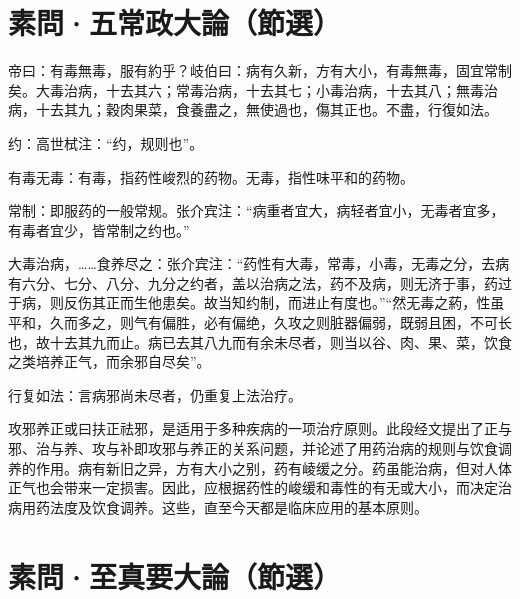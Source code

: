 \documentclass[draft,12pt]{ctexbook}
\begin{document}

\section{素問·五常政大論（節選）}%


\begin{yuanwen}
帝曰：有毒無毒，服有約乎？岐伯曰：病有久新，方有大小，有毒無毒，固宜常制矣。大毒治病，十去其六；常毒治病，十去其七；小毒治病，十去其八；無毒治病，十去其九；穀肉果菜，食養盡之，無使過也，傷其正也。不盡，行復如法。
\end{yuanwen}


\begin{jiaozhu}
	\item 约：高世栻注：“约，规则也”。
	\item 有毒无毒：有毒，指药性峻烈的药物。无毒，指性味平和的药物。
	\item 常制：即服药的一般常规。张介宾注：“病重者宜大，病轻者宜小，无毒者宜多，有毒者宜少，皆常制之约也。”
	\item 大毒治病，……食养尽之：张介宾注：“药性有大毒，常毒，小毒，无毒之分，去病有六分、七分、八分、九分之约者，盖以治病之法，药不及病，则无济于事，药过于病，则反伤其正而生他患矣。故当知约制，而进止有度也。”“然无毒之葯，性虽平和，久而多之，则气有偏胜，必有偏绝，久攻之则脏器偏弱，既弱且困，不可长也，故十去其九而止。病已去其八九而有余未尽者，则当以谷、肉、果、菜，饮食之类培养正气，而余邪自尽矣”。
	\item 行复如法：言病邪尚未尽者，仍重复上法治疗。
\end{jiaozhu}



攻邪养正或曰扶正祛邪，是适用于多种疾病的一项治疗原则。此段经文提出了正与邪、治与养、攻与补即攻邪与养正的关系问题，并论述了用药治病的规则与饮食调养的作用。病有新旧之异，方有大小之别，药有崚缓之分。药虽能治病，但对人体正气也会带来一定损害。因此，应根据药性的峻缓和毒性的有无或大小，而决定治病用药法度及饮食调养。这些，直至今天都是临床应用的基本原则。


\section{素問·至真要大論（節選）}%
\end{document}
